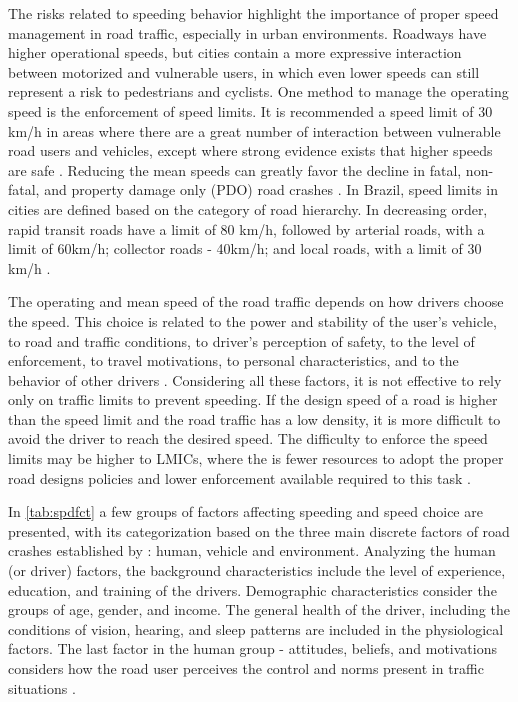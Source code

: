 The risks related to speeding behavior highlight the importance of proper speed management in road traffic, especially in urban environments. Roadways have higher operational speeds, but cities contain a more expressive interaction between motorized and vulnerable users, in which even lower speeds can still represent a risk to pedestrians and cyclists. One method to manage the operating speed is the enforcement of speed limits. It is recommended a speed limit of 30 km/h in areas where there are a great number of interaction between vulnerable road users and vehicles, except where strong evidence exists that higher speeds are safe \cite{WHO2020,whoGlobalPlanDecade2021}. Reducing the mean speeds can greatly favor the decline in fatal, non-fatal, and property damage only (PDO) road crashes \cite{Elvik2013}. In Brazil, speed limits in cities are defined based on the category of road hierarchy. In decreasing order, rapid transit roads have a limit of 80 km/h, followed by arterial roads, with a limit of 60km/h; collector roads - 40km/h; and local roads, with a limit of 30 km/h \cite{Brasil1997}.

The operating and mean speed of the road traffic depends on how drivers choose the speed. This choice is related to the power and stability of the user's vehicle, to road and traffic conditions, to driver's perception of safety, to the level of enforcement, to travel motivations, to personal characteristics, and to the behavior of other drivers \cite{Mohan2016a, Shinar2017}. Considering all these factors, it is not effective to rely only on traffic limits to prevent speeding. If the design speed of a road is higher than the speed limit and the road traffic has a low density, it is more difficult to avoid the driver to reach the desired speed. The difficulty to enforce the speed limits may be higher to LMICs, where the is fewer resources to adopt the proper road designs policies and lower enforcement available required to this task \cite{Mohan2016a}. 

In \autoref{tab:spdfct} a few groups of factors affecting speeding and speed choice are presented, with its categorization based on the three main discrete factors of road crashes established by \textcite{Haddon1980}: human, vehicle and environment. Analyzing the human (or driver) factors, the background characteristics include the level of experience, education, and training of the drivers. Demographic characteristics consider the groups of age, gender, and income. The general health of the driver, including the conditions of vision, hearing, and sleep patterns are included in the physiological factors. The last factor in the human group - attitudes, beliefs, and motivations considers how the road user perceives the control and norms present in traffic situations \cite{Richard2013a}.  

